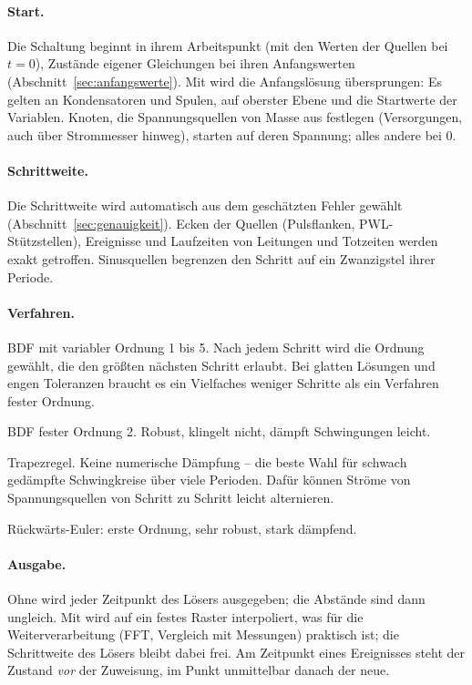\paragraph{Start.}
Die Schaltung beginnt in ihrem Arbeitspunkt (mit den Werten der Quellen bei
$t=0$), Zustände eigener Gleichungen bei ihren Anfangswerten
(Abschnitt~\ref{sec:anfangswerte}). Mit  wird die
Anfangslösung übersprungen: Es gelten  an Kondensatoren und
Spulen,  auf oberster Ebene und die
Startwerte der Variablen. Knoten, die Spannungsquellen von Masse aus
festlegen (Versorgungen, auch über Strommesser hinweg), starten auf deren
Spannung; alles andere bei 0.

\paragraph{Schrittweite.}
Die Schrittweite wird automatisch aus dem geschätzten Fehler gewählt
(Abschnitt~\ref{sec:genauigkeit}). Ecken der Quellen (Pulsflanken,
PWL-Stützstellen), Ereignisse und Laufzeiten von Leitungen und Totzeiten
werden exakt getroffen. Sinusquellen begrenzen den Schritt auf ein
Zwanzigstel ihrer Periode.

\paragraph{Verfahren.}
\begin{description}[style=nextline,leftmargin=2em]
  \item[\code{bdf} (Standard)]
    BDF mit variabler Ordnung 1 bis 5. Nach jedem Schritt wird die
    Ordnung gewählt, die den größten nächsten Schritt erlaubt. Bei glatten
    Lösungen und engen Toleranzen braucht es ein Vielfaches weniger
    Schritte als ein Verfahren fester Ordnung.
  \item[{\code{gear2}}]
    BDF fester Ordnung 2. Robust, klingelt nicht, dämpft Schwingungen
    leicht.
  \item[{\code{trap}}]
    Trapezregel. Keine numerische Dämpfung – die beste Wahl für schwach
    gedämpfte Schwingkreise über viele Perioden. Dafür können Ströme von
    Spannungsquellen von Schritt zu Schritt leicht alternieren.
  \item[{\code{be}}]
    Rückwärts-Euler: erste Ordnung, sehr robust, stark dämpfend.
\end{description}

\paragraph{Ausgabe.}
Ohne  wird jeder Zeitpunkt des Lösers ausgegeben; die
Abstände sind dann ungleich. Mit  wird auf ein festes
Raster interpoliert, was für die Weiterverarbeitung (FFT, Vergleich mit
Messungen) praktisch ist; die Schrittweite des Lösers bleibt dabei frei.
Am Zeitpunkt eines Ereignisses steht der Zustand \emph{vor} der Zuweisung,
im Punkt unmittelbar danach der neue.

